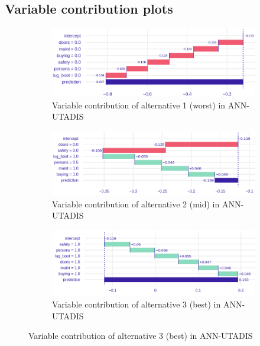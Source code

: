 \documentclass[../main.tex]{subfiles}
\begin{document}
\subsection{Variable contribution plots}
\begin{figure}[H]
    \centering
    \begin{subfigure}{\linewidth}
        \includegraphics[width=\linewidth]{../img/UTA-breakdown-worst.png}
        \caption{Variable contribution of alternative 1 (worst) in ANN-UTADIS}
        \label{fig:UTA-3alt1-contrib}
    \end{subfigure}
    \begin{subfigure}{\linewidth}
        \includegraphics[width=\linewidth]{../img/UTA-breakdown-mid.png}
        \caption{Variable contribution of alternative 2 (mid) in ANN-UTADIS}
        \label{fig:UTA-3alt2-contrib}
    \end{subfigure}
    \begin{subfigure}{\linewidth}
        \includegraphics[width=\linewidth]{../img/UTA-breakdown-best.png}
        \caption{Variable contribution of alternative 3 (best) in ANN-UTADIS}
        \label{fig:UTA-3alt3-contrib}
    \end{subfigure}
\end{figure}
\end{document}
